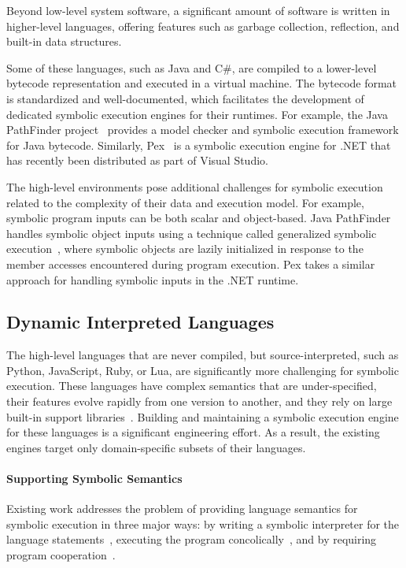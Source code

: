 Beyond low-level system software, a significant amount of software is written in higher-level languages, offering features such as garbage collection, reflection, and built-in data structures.

Some of these languages, such as Java and C\#, are compiled to a lower-level bytecode representation and executed in a virtual machine.
%
The bytecode format is standardized and well-documented, which facilitates the development of dedicated symbolic execution engines for their runtimes.
%
For example, the Java PathFinder project~\cite{visser-jpf,jpf-symbex,jpf-testgen} provides a model checker and symbolic execution framework for Java bytecode.
%
Similarly, Pex~\cite{tillmann-pex} is a symbolic execution engine for .NET that has recently been distributed as part of Visual Studio.

The high-level environments pose additional challenges for symbolic execution related to the complexity of their data and execution model.  For example, symbolic program inputs can be both scalar and object-based.
%
Java PathFinder handles symbolic object inputs using a technique called generalized symbolic execution~\cite{generalized-symbex}, where symbolic objects are lazily initialized in response to the member accesses encountered during program execution.  Pex takes a similar approach for handling symbolic inputs in the .NET runtime.

\subsection{Dynamic Interpreted Languages}

The high-level languages that are never compiled, but source-interpreted, such as Python, JavaScript, Ruby, or Lua, are significantly more challenging for symbolic execution.
%
These languages have complex semantics that are under-specified, their features evolve rapidly from one version to another, and they rely on large built-in support libraries~\cite{dom2011,cutie-py,pythonReference}.
%
Building and maintaining a symbolic execution engine for these languages is a significant engineering effort.  As a result, the existing engines target only domain-specific subsets of their languages.

\paragraph{Supporting Symbolic Semantics}

Existing work addresses the problem of providing language semantics for symbolic execution in three major ways: by writing a symbolic interpreter for the language statements~\cite{nice}, executing the program concolically~\cite{cutie-py,jalangi}, and by requiring program cooperation~\cite{commuter}.

